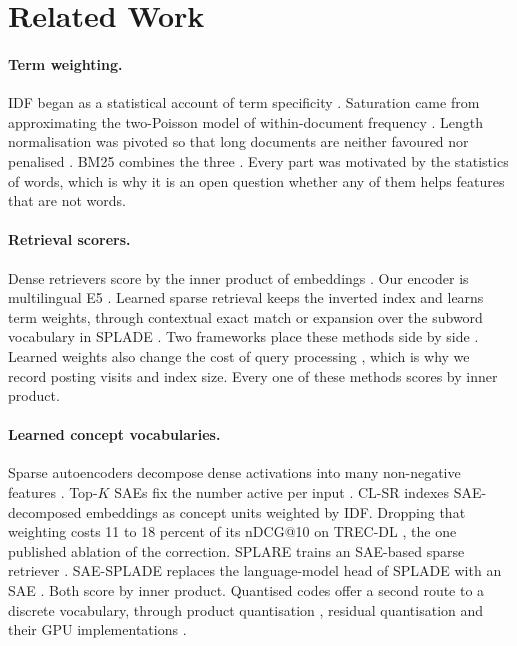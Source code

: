 \documentclass[11pt]{article}
\begin{document}
\section{Related Work}
\label{sec:related}

\paragraph{Term weighting.} IDF began as a statistical account of term specificity
\citep{sparckjones1972idf}. Saturation came from approximating the two-Poisson model of
within-document frequency \citep{robertson1994poisson}. Length normalisation was pivoted
so that long documents are neither favoured nor penalised \citep{singhal1996pivoted}.
BM25 combines the three \citep{robertson2009bm25}. Every part was motivated by the
statistics of words, which is why it is an open question whether any of them helps
features that are not words.

\paragraph{Retrieval scorers.} Dense retrievers score by the inner product of embeddings
\citep{karpukhin2020dpr}. Our encoder is multilingual E5 \citep{wang2024me5}. Learned
sparse retrieval keeps the inverted index and learns term weights, through contextual
exact match \citep{gao2021coil} or expansion over the subword vocabulary in SPLADE
\citep{formal2021splade,formal2021spladev2,lassance2024spladev3}. Two frameworks place
these methods side by side \citep{lin2021conceptual,nguyen2023unified}. Learned weights
also change the cost of query processing \citep{mackenzie2021wacky}, which is why we
record posting visits and index size. Every one of these methods scores by inner product.

\paragraph{Learned concept vocabularies.} Sparse autoencoders decompose dense activations
into many non-negative features \citep{cunningham2024sae}. Top-$K$ SAEs fix the number
active per input \citep{gao2025topksae}. CL-SR indexes SAE-decomposed embeddings as
concept units weighted by IDF. Dropping that weighting costs 11 to 18 percent of its
nDCG@10 on TREC-DL \citep{park2025clsr}, the one published ablation of the correction.
SPLARE trains an SAE-based sparse retriever \citep{formal2026splare}. SAE-SPLADE replaces
the language-model head of SPLADE with an SAE \citep{zong2026tokens}. Both score by inner
product. Quantised codes offer a second route to a discrete vocabulary, through product
quantisation \citep{jegou2011pq}, residual quantisation \citep{chen2010rq} and their GPU
implementations \citep{johnson2021faiss}.
\end{document}
